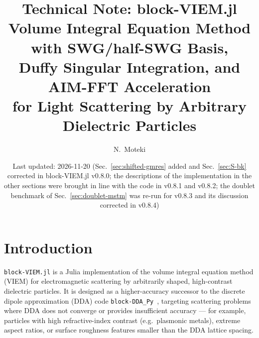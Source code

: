\documentclass[11pt,a4paper]{article}
\title{Technical Note: block-VIEM.jl\\[4pt]
\large Volume Integral Equation Method with SWG/half-SWG Basis,\\
Duffy Singular Integration, and AIM-FFT Acceleration\\
for Light Scattering by Arbitrary Dielectric Particles}
\author{N.\ Moteki}
\date{Last updated: 2026-11-20 (Sec.~\ref{sec:shifted-gmres} added and
Sec.~\ref{sec:S-bk} corrected in block-VIEM.jl v0.8.0; the
descriptions of the implementation in the other sections were brought
in line with the code in v0.8.1 and v0.8.2; the doublet benchmark of
Sec.~\ref{sec:doublet-mstm} was re-run for v0.8.3 and its discussion
corrected in v0.8.4)}
\begin{document}
\maketitle
\tableofcontents
\newpage

\section{Introduction}
\label{sec:introduction}

\texttt{block-VIEM.jl} is a Julia implementation of the volume integral
equation method (VIEM) for electromagnetic scattering by arbitrarily
shaped, high-contrast dielectric particles. It is designed as a
higher-accuracy successor to the discrete dipole approximation (DDA)
code \texttt{block-DDA\_Py}~\cite{Moteki2024}, targeting scattering
problems where DDA does not converge or provides insufficient accuracy
--- for example, particles with high refractive-index contrast (e.g.\
plasmonic metals), extreme aspect ratios, or surface roughness features
smaller than the DDA lattice spacing.
\end{document}
